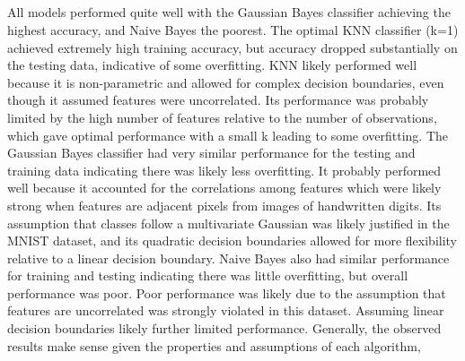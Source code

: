 \documentclass[12pt,letterpaper]{article} %
\begin{document}
 \subsection{}
 All models performed quite well with the Gaussian Bayes classifier achieving the highest accuracy, and Naive Bayes the poorest. The optimal KNN classifier (k=1) achieved extremely high training accuracy, but accuracy dropped substantially on the testing data, indicative of some overfitting. KNN likely performed well because it is non-parametric and allowed for complex decision boundaries, even though it assumed features were uncorrelated. Its performance was probably limited by the high number of features relative to the number of observations, which gave optimal performance with a small k leading to some overfitting. The Gaussian Bayes classifier had very similar performance for the testing and training data indicating there was likely less overfitting. It probably performed well because it accounted for the correlations among features which were likely strong when features are adjacent pixels from images of handwritten digits. Its assumption that classes follow a multivariate Gaussian was likely justified in the MNIST dataset, and its quadratic decision boundaries allowed for more flexibility relative to a linear decision boundary. Naive Bayes also had similar performance for training and testing indicating there was little overfitting, but overall performance was poor. Poor performance was likely due to the assumption that features are uncorrelated was strongly violated in this dataset. Assuming linear decision boundaries  likely further limited performance. Generally, the observed results make sense given the properties and assumptions of each algorithm, 
 
\end{document}

